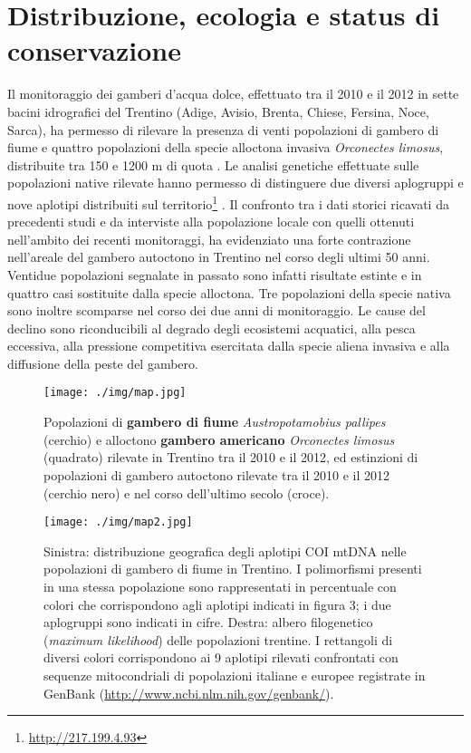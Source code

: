 \documentclass[10pt,twoside,openany,x11names,svgnames,italian,a5paper,dvipsnames,table]{memoir}
\begin{document}
\section{Distribuzione, ecologia e status di conservazione}
Il monitoraggio dei gamberi d’acqua dolce, effettuato tra il 2010 e il 2012 in sette bacini idrografici del Trentino (Adige, Avisio, Brenta, Chiese, Fersina, Noce, Sarca), ha permesso di rilevare la presenza di venti popolazioni di gambero di fiume e quattro popolazioni della specie alloctona invasiva \emph{Orconectes limosus}, distribuite tra 150 e 1200 m di quota \cite{Endrizzi13a}. Le analisi genetiche effettuate sulle popolazioni native rilevate hanno permesso di distinguere due diversi \gls{aplogruppi} e nove \gls{aplotipi} distribuiti sul territorio\footnote{\url{http://217.199.4.93}} \cite{Endrizzi13b}. Il confronto tra i dati storici ricavati da precedenti studi \cite{Fratini} \cite{Albrecht} \cite{PAT} \cite{Maiolini} \cite{Paoli} \cite{Pagotto} e da interviste alla popolazione locale con quelli ottenuti nell’ambito dei recenti monitoraggi, ha evidenziato una forte contrazione nell’areale del gambero autoctono in Trentino nel corso degli ultimi 50 anni. Ventidue popolazioni segnalate in passato sono infatti risultate estinte e in quattro casi sostituite dalla specie alloctona. Tre popolazioni della specie nativa sono inoltre scomparse nel corso dei due anni di monitoraggio. Le cause del declino sono riconducibili al degrado degli ecosistemi acquatici, alla pesca eccessiva, alla pressione competitiva esercitata dalla specie aliena invasiva e alla diffusione della peste del gambero. 

\begin{figure}[H]
  \centering
  \texttt{[image: ./img/map.jpg]}
    \caption*{Popolazioni di \textbf{gambero di fiume} \emph{Austropotamobius pallipes} (cerchio) e alloctono \textbf{gambero americano} \emph{Orconectes limosus} (quadrato) rilevate in Trentino tra il 2010 e il 2012, ed estinzioni di popolazioni di gambero autoctono rilevate tra il 2010 e il 2012 (cerchio nero) e nel corso dell’ultimo secolo (croce). \cite{Endrizzi13a}}
\label{img:gambero_distr}
\end{figure}
\begin{figure}[H]
  \centering
  \texttt{[image: ./img/map2.jpg]}
    \caption*{Sinistra: distribuzione geografica degli aplotipi COI mtDNA nelle popolazioni di gambero di fiume in Trentino. I polimorfismi presenti in una stessa popolazione sono rappresentati in percentuale con colori che corrispondono agli aplotipi indicati in figura 3; i due aplogruppi sono indicati in cifre. Destra: albero filogenetico (\emph{maximum likelihood}) delle popolazioni trentine. I rettangoli di diversi colori corrispondono ai 9 aplotipi rilevati confrontati con sequenze mitocondriali di popolazioni italiane e europee registrate in GenBank (\url{http://www.ncbi.nlm.nih.gov/genbank/}).}
\label{img:gambero_gene}
\end{figure}
\end{document}

